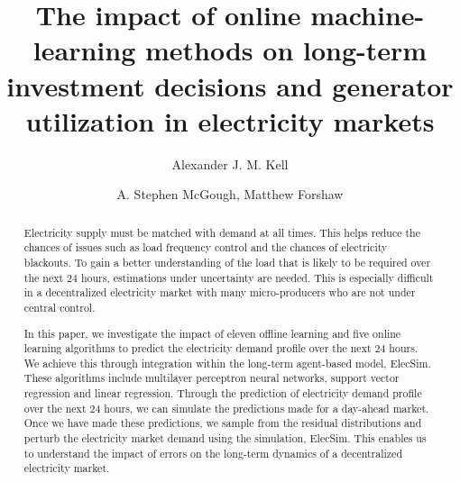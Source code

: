 \documentclass[final,3p,times,twocolumn,numbers]{elsarticle}
\begin{document}
\begin{frontmatter}


 \title{The impact of online machine-learning methods on long-term investment decisions and generator utilization in electricity markets}
 \author{Alexander J. M. Kell}



\author{A. Stephen McGough, Matthew Forshaw}

\address{School of Computing, Newcastle University, Newcastle upon Tyne, United Kingdom}

\begin{abstract}


Electricity supply must be matched with demand at all times. This helps reduce the chances of issues such as load frequency control and the chances of electricity blackouts. To gain a better understanding of the load that is likely to be required over the next 24 hours, estimations under uncertainty are needed. This is especially difficult in a decentralized electricity market with many micro-producers who are not under central control. 


In this paper, we investigate the impact of eleven offline learning and five online learning algorithms to predict the electricity demand profile over the next 24 hours. We achieve this through integration within the long-term agent-based model, ElecSim. These algorithms include multilayer perceptron neural networks, support vector regression and linear regression. Through the prediction of electricity demand profile over the next 24 hours, we can simulate the predictions made for a day-ahead market. Once we have made these predictions, we sample from the residual distributions and perturb the electricity market demand using the simulation, ElecSim. This enables us to understand the impact of errors on the long-term dynamics of a decentralized electricity market.
 


\end{abstract}
\end{frontmatter}
\end{document}
